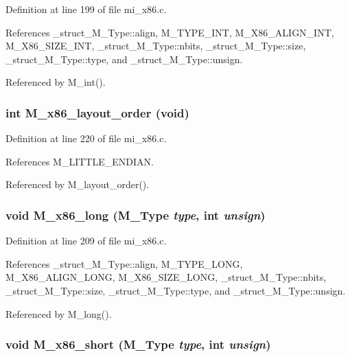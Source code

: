 Definition at line 199 of file mi\_\-x86.c.

References \_\-struct\_\-M\_\-Type::align, M\_\-TYPE\_\-INT, M\_\-X86\_\-ALIGN\_\-INT, M\_\-X86\_\-SIZE\_\-INT, \_\-struct\_\-M\_\-Type::nbits, \_\-struct\_\-M\_\-Type::size, \_\-struct\_\-M\_\-Type::type, and \_\-struct\_\-M\_\-Type::unsign.

Referenced by M\_\-int().
\subsubsection{\setlength{\rightskip}{0pt plus 5cm}int M\_\-x86\_\-layout\_\-order (void)}\label{mi__x86_8c_e57becf5b70251b6e50db8171352073d}




Definition at line 220 of file mi\_\-x86.c.

References M\_\-LITTLE\_\-ENDIAN.

Referenced by M\_\-layout\_\-order().
\subsubsection{\setlength{\rightskip}{0pt plus 5cm}void M\_\-x86\_\-long (\bf{M\_\-Type} {\em type}, int {\em unsign})}\label{mi__x86_8c_786bdf3a1143379eeaa1eacf8a0927f5}




Definition at line 209 of file mi\_\-x86.c.

References \_\-struct\_\-M\_\-Type::align, M\_\-TYPE\_\-LONG, M\_\-X86\_\-ALIGN\_\-LONG, M\_\-X86\_\-SIZE\_\-LONG, \_\-struct\_\-M\_\-Type::nbits, \_\-struct\_\-M\_\-Type::size, \_\-struct\_\-M\_\-Type::type, and \_\-struct\_\-M\_\-Type::unsign.

Referenced by M\_\-long().
\subsubsection{\setlength{\rightskip}{0pt plus 5cm}void M\_\-x86\_\-short (\bf{M\_\-Type} {\em type}, int {\em unsign})}\label{mi__x86_8c_8a66fb0210defe9dde756f6a338b787d}




